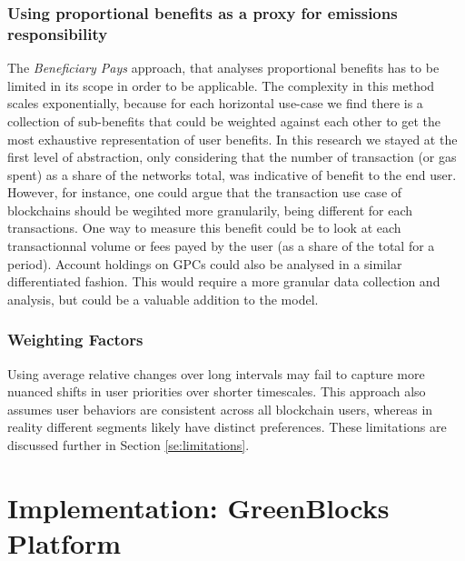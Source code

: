 \documentclass[11pt]{report}
\begin{document}
\subsection{Using proportional benefits as a proxy for emissions responsibility}
The \textit{Beneficiary Pays} approach, that analyses proportional benefits has to be limited in its scope in order to be applicable. The complexity in this method scales exponentially, because for each horizontal use-case we find there is a collection of sub-benefits that could be weighted against each other to get the most exhaustive representation of user benefits. In this research we stayed at the first level of abstraction, only considering that the number of transaction (or gas spent) as a share of the networks total, was indicative of benefit to the end user. However, for instance, one could argue that the transaction use case of blockchains should be wegihted more granularily, being different for each transactions. One way to measure this benefit could be to look at each transactionnal volume or fees payed by the user (as a share of the total for a period). Account holdings on GPCs could also be analysed in a similar differentiated fashion. This would require a more granular data collection and analysis, but could be a valuable addition to the model.

\subsection{Weighting Factors}
Using average relative changes over long intervals may fail to capture more nuanced shifts in user priorities over shorter timescales. This approach also assumes user behaviors are consistent across all blockchain users, whereas in reality different segments likely have distinct preferences. These limitations are discussed further in Section \ref{se:limitations}.




\chapter{Implementation: GreenBlocks Platform}
\end{document}
